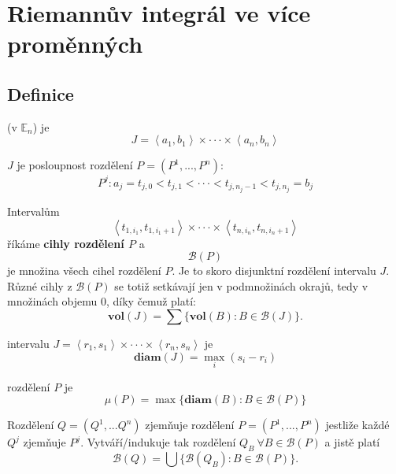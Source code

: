\documentclass[../main.tex]{subfiles}
\begin{document}
\section{Riemannův integrál ve více proměnných}

\subsection{Definice}

\begin{definitionnodot}
	 (v $\mathbb{E}_n$) je 
	\[J = \left<a_1,b_1\right> \times \cdot \cdot \cdot \times \left<a_n,b_n\right>\]
\end{definitionnodot}

\begin{definitionnodot}
	$J$ je posloupnost rozdělení $P = (P^1,...,P^n)$:
	\[P^j : a_j = t_{j,0} < t_{j,1} < \cdot \cdot \cdot < t_{j,n_j-1} < t_{j,n_j} = b_j\]
\end{definitionnodot}

\begin{definition}[Cihly]
	Intervalům
	\[\left<t_{1,i_1},t_{1,i_1+1}\right> \times \cdot \cdot \cdot \times \left<t_{n,i_n},t_{n,i_n+1}\right>\]
	říkáme \textbf{cihly rozdělení $P$} a $$\mathcal{B}(P)$$ je množina všech cihel rozdělení $P$. Je to skoro disjunktní rozdělení intervalu $J$.
	Různé cihly z $\mathcal{B}(P)$ se totiž setkávají jen v podmnožinách okrajů, tedy v množinách objemu 0, díky čemuž platí:
	\[\textbf{vol}(J) = \sum \{\textbf{vol}(B) : B \in \mathcal{B}(J)\}.\]
\end{definition}

\begin{definitionnodot}
	intervalu $J = \left<r_1,s_1\right> \times \cdot \cdot \cdot \times \left<r_n,s_n\right>$ je
	\[\textbf{diam}(J) = \max_i (s_i - r_i)\]
\end{definitionnodot}

\begin{definitionnodot}[Jemnost]
	rozdělení $P$ je 
	\[\mu(P) = \max \{\textbf{diam}(B) : B \in \mathcal{B}(P)\}\]
\end{definitionnodot}

\begin{definition}[Zjemnění]
	Rozdělení $Q = (Q^1,...Q^n) $ zjemňuje rozdělení $P = (P^1,...,P^n)$ jestliže každé $Q^j$ zjemňuje $P^j$.
	Vytváří/indukuje tak rozdělení $Q_B\ \forall B \in \mathcal{B}(P)$ a jistě platí
	\[\mathcal{B}(Q) = \bigcup \{\mathcal{B}(Q_B) : B \in \mathcal{B}(P)\}.\]
\end{definition}
\end{document}
